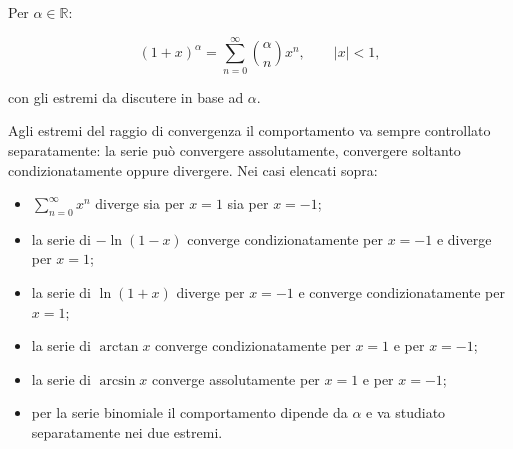 Per \(\alpha\in\mathbb R\):

\[
(1+x)^\alpha
=\sum_{n=0}^{\infty}\binom{\alpha}{n}x^n,
\qquad |x|<1,
\]

con gli estremi da discutere in base ad \(\alpha\).

Agli estremi del raggio di convergenza il comportamento va sempre controllato separatamente: la serie può convergere assolutamente, convergere soltanto condizionatamente oppure divergere. Nei casi elencati sopra:

\begin{itemize}
\listaCompatta
\item
  \(\sum_{n=0}^{\infty}x^n\) diverge sia per \(x=1\) sia per \(x=-1\);
\item
  la serie di \(-\ln(1-x)\) converge condizionatamente per \(x=-1\) e diverge per \(x=1\);
\item
  la serie di \(\ln(1+x)\) diverge per \(x=-1\) e converge condizionatamente per \(x=1\);
\item
  la serie di \(\arctan x\) converge condizionatamente per \(x=1\) e per \(x=-1\);
\item
  la serie di \(\arcsin x\) converge assolutamente per \(x=1\) e per \(x=-1\);
\item
  per la serie binomiale il comportamento dipende da \(\alpha\) e va studiato separatamente nei due estremi.
\end{itemize}
